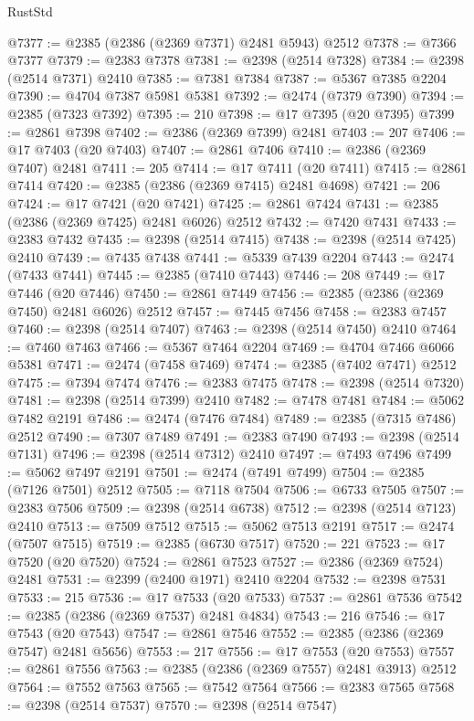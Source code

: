 \begin{lexlean}{RustStd}
\begin{coremodule}
@7377 := @2385 (@2386 (@2369 @7371) @2481 @5943) @2512
@7378 := @7366 @7377
@7379 := @2383 @7378
@7381 := @2398 (@2514 @7328)
@7384 := @2398 (@2514 @7371) @2410
@7385 := @7381 @7384
@7387 := @5367 @7385 @2204
@7390 := @4704 @7387 @5981 @5381
@7392 := @2474 (@7379 @7390)
@7394 := @2385 (@7323 @7392)
@7395 := 210
@7398 := @17 @7395 (@20 @7395)
@7399 := @2861 @7398
@7402 := @2386 (@2369 @7399) @2481
@7403 := 207
@7406 := @17 @7403 (@20 @7403)
@7407 := @2861 @7406
@7410 := @2386 (@2369 @7407) @2481
@7411 := 205
@7414 := @17 @7411 (@20 @7411)
@7415 := @2861 @7414
@7420 := @2385 (@2386 (@2369 @7415) @2481 @4698)
@7421 := 206
@7424 := @17 @7421 (@20 @7421)
@7425 := @2861 @7424
@7431 := @2385 (@2386 (@2369 @7425) @2481 @6026) @2512
@7432 := @7420 @7431
@7433 := @2383 @7432
@7435 := @2398 (@2514 @7415)
@7438 := @2398 (@2514 @7425) @2410
@7439 := @7435 @7438
@7441 := @5339 @7439 @2204
@7443 := @2474 (@7433 @7441)
@7445 := @2385 (@7410 @7443)
@7446 := 208
@7449 := @17 @7446 (@20 @7446)
@7450 := @2861 @7449
@7456 := @2385 (@2386 (@2369 @7450) @2481 @6026) @2512
@7457 := @7445 @7456
@7458 := @2383 @7457
@7460 := @2398 (@2514 @7407)
@7463 := @2398 (@2514 @7450) @2410
@7464 := @7460 @7463
@7466 := @5367 @7464 @2204
@7469 := @4704 @7466 @6066 @5381
@7471 := @2474 (@7458 @7469)
@7474 := @2385 (@7402 @7471) @2512
@7475 := @7394 @7474
@7476 := @2383 @7475
@7478 := @2398 (@2514 @7320)
@7481 := @2398 (@2514 @7399) @2410
@7482 := @7478 @7481
@7484 := @5062 @7482 @2191
@7486 := @2474 (@7476 @7484)
@7489 := @2385 (@7315 @7486) @2512
@7490 := @7307 @7489
@7491 := @2383 @7490
@7493 := @2398 (@2514 @7131)
@7496 := @2398 (@2514 @7312) @2410
@7497 := @7493 @7496
@7499 := @5062 @7497 @2191
@7501 := @2474 (@7491 @7499)
@7504 := @2385 (@7126 @7501) @2512
@7505 := @7118 @7504
@7506 := @6733 @7505
@7507 := @2383 @7506
@7509 := @2398 (@2514 @6738)
@7512 := @2398 (@2514 @7123) @2410
@7513 := @7509 @7512
@7515 := @5062 @7513 @2191
@7517 := @2474 (@7507 @7515)
@7519 := @2385 (@6730 @7517)
@7520 := 221
@7523 := @17 @7520 (@20 @7520)
@7524 := @2861 @7523
@7527 := @2386 (@2369 @7524) @2481
@7531 := @2399 (@2400 @1971) @2410 @2204
@7532 := @2398 @7531
@7533 := 215
@7536 := @17 @7533 (@20 @7533)
@7537 := @2861 @7536
@7542 := @2385 (@2386 (@2369 @7537) @2481 @4834)
@7543 := 216
@7546 := @17 @7543 (@20 @7543)
@7547 := @2861 @7546
@7552 := @2385 (@2386 (@2369 @7547) @2481 @5656)
@7553 := 217
@7556 := @17 @7553 (@20 @7553)
@7557 := @2861 @7556
@7563 := @2385 (@2386 (@2369 @7557) @2481 @3913) @2512
@7564 := @7552 @7563
@7565 := @7542 @7564
@7566 := @2383 @7565
@7568 := @2398 (@2514 @7537)
@7570 := @2398 (@2514 @7547)

\end{coremodule}
\end{lexlean}
